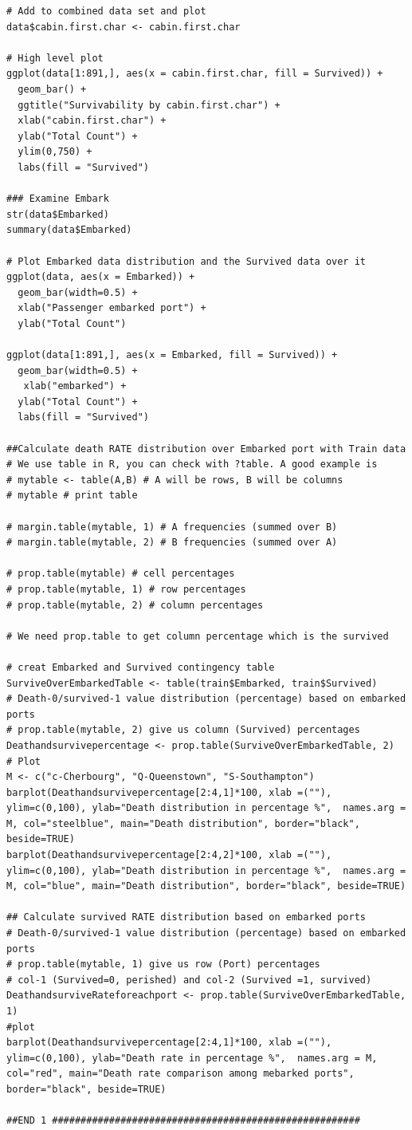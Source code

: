 \documentclass[
]{book}
\begin{document}
\begin{verbatim}
# Add to combined data set and plot
data$cabin.first.char <- cabin.first.char

# High level plot
ggplot(data[1:891,], aes(x = cabin.first.char, fill = Survived)) +
  geom_bar() +
  ggtitle("Survivability by cabin.first.char") +
  xlab("cabin.first.char") +
  ylab("Total Count") +
  ylim(0,750) +
  labs(fill = "Survived")

### Examine Embark
str(data$Embarked)
summary(data$Embarked)

# Plot Embarked data distribution and the Survived data over it
ggplot(data, aes(x = Embarked)) +
  geom_bar(width=0.5) +
  xlab("Passenger embarked port") +
  ylab("Total Count")

ggplot(data[1:891,], aes(x = Embarked, fill = Survived)) +
  geom_bar(width=0.5) +
   xlab("embarked") +
  ylab("Total Count") +
  labs(fill = "Survived")

##Calculate death RATE distribution over Embarked port with Train data
# We use table in R, you can check with ?table. A good example is
# mytable <- table(A,B) # A will be rows, B will be columns
# mytable # print table

# margin.table(mytable, 1) # A frequencies (summed over B)
# margin.table(mytable, 2) # B frequencies (summed over A)

# prop.table(mytable) # cell percentages
# prop.table(mytable, 1) # row percentages
# prop.table(mytable, 2) # column percentages

# We need prop.table to get column percentage which is the survived

# creat Embarked and Survived contingency table
SurviveOverEmbarkedTable <- table(train$Embarked, train$Survived)
# Death-0/survived-1 value distribution (percentage) based on embarked ports
# prop.table(mytable, 2) give us column (Survived) percentages
Deathandsurvivepercentage <- prop.table(SurviveOverEmbarkedTable, 2)
# Plot
M <- c("c-Cherbourg", "Q-Queenstown", "S-Southampton")
barplot(Deathandsurvivepercentage[2:4,1]*100, xlab =(""), ylim=c(0,100), ylab="Death distribution in percentage %",  names.arg = M, col="steelblue", main="Death distribution", border="black", beside=TRUE)
barplot(Deathandsurvivepercentage[2:4,2]*100, xlab =(""), ylim=c(0,100), ylab="Death distribution in percentage %",  names.arg = M, col="blue", main="Death distribution", border="black", beside=TRUE)

## Calculate survived RATE distribution based on embarked ports
# Death-0/survived-1 value distribution (percentage) based on embarked ports
# prop.table(mytable, 1) give us row (Port) percentages
# col-1 (Survived=0, perished) and col-2 (Survived =1, survived)
DeathandsurviveRateforeachport <- prop.table(SurviveOverEmbarkedTable, 1)
#plot
barplot(Deathandsurvivepercentage[2:4,1]*100, xlab =(""), ylim=c(0,100), ylab="Death rate in percentage %",  names.arg = M, col="red", main="Death rate comparison among mebarked ports", border="black", beside=TRUE)

##END 1 ######################################################
\end{verbatim}
\end{document}
